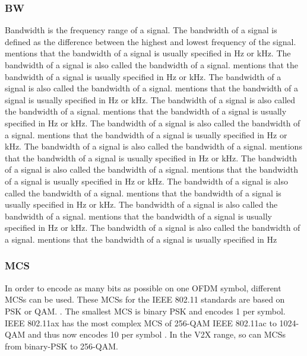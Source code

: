 \subsubsection*{\acf{BW}}
Bandwidth is the frequency range of a signal. The bandwidth of a signal is defined as the difference between the highest and lowest frequency of the signal. \textcite{kauffels_wireless_2002} mentions that the bandwidth of a signal is usually specified in \ac{Hz} or \ac{kHz}. The bandwidth of a signal is also called the bandwidth of a signal. \textcite{kauffels_wireless_2002} mentions that the bandwidth of a signal is usually specified in \ac{Hz} or \ac{kHz}. The bandwidth of a signal is also called the bandwidth of a signal. \textcite{kauffels_wireless_2002} mentions that the bandwidth of a signal is usually specified in \ac{Hz} or \ac{kHz}. The bandwidth of a signal is also called the bandwidth of a signal. \textcite{kauffels_wireless_2002} mentions that the bandwidth of a signal is usually specified in \ac{Hz} or \ac{kHz}. The bandwidth of a signal is also called the bandwidth of a signal. \textcite{kauffels_wireless_2002} mentions that the bandwidth of a signal is usually specified in \ac{Hz} or \ac{kHz}. The bandwidth of a signal is also called the bandwidth of a signal. \textcite{kauffels_wireless_2002} mentions that the bandwidth of a signal is usually specified in \ac{Hz} or \ac{kHz}. The bandwidth of a signal is also called the bandwidth of a signal. \textcite{kauffels_wireless_2002} mentions that the bandwidth of a signal is usually specified in \ac{Hz} or \ac{kHz}. The bandwidth of a signal is also called the bandwidth of a signal. \textcite{kauffels_wireless_2002} mentions that the bandwidth of a signal is usually specified in \ac{Hz} or \ac{kHz}. The bandwidth of a signal is also called the bandwidth of a signal. \textcite{kauffels_wireless_2002} mentions that the bandwidth of a signal is usually specified in \ac{Hz} or \ac{kHz}. The bandwidth of a signal
is also called the bandwidth of a signal. \textcite{kauffels_wireless_2002} mentions that the bandwidth of a signal is usually specified in \ac{Hz}

\subsubsection*{\acf{MCS}}

In order to encode as many bits as possible on one \ac{OFDM} symbol, different \ac{MCS}s can be used.
These \ac{MCS}s for the IEEE 802.11 standards are based on \ac{PSK} or \ac{QAM}. \cite{kauffels_wireless_2002}. 
The smallest \ac{MCS} is binary \ac{PSK} and encodes \SI{1}{\bit} per symbol. IEEE 802.11ax has the most complex \ac{MCS} of \num{256}-\ac{QAM} IEEE 802.11ac to \num{1024}-\ac{QAM} and thus now encodes \SI{10}{\bit} per symbol \cite{afaqui_ieee_2017}.
In the \ac{V2X} range, so can \ac{MCS}s from binary-\ac{PSK} to \num{256}-\ac{QAM}.

